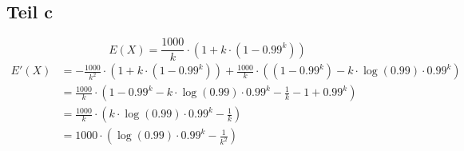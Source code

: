 \documentclass[10pt,a4paper]{article}
\begin{document}
\subsection{Teil c}
\begin{equation}
  E(X) = \frac{1000}{k} \cdot \left( 1 + k \cdot \left( 1 - 0.99^{k} \right) \right)
\end{equation}
\begin{align*}
  E'(X) & = -\frac{1000}{k^{2}} \cdot \left( 1 + k \cdot \left( 1 - 0.99^{k} \right) \right) + \frac{1000}{k} \cdot ((1 - 0.99^{k}) - k \cdot \log(0.99) \cdot 0.99^{k})\\
  & = \frac{1000}{k} \cdot \left( 1 - 0.99^{k} - k \cdot \log(0.99) \cdot 0.99^{k} - \frac{1}{k} - 1 + 0.99^{k} \right)\\
  & = \frac{1000}{k} \cdot \left( k \cdot \log(0.99) \cdot 0.99^{k} - \frac{1}{k} \right)\\
  & = 1000 \cdot \left( \log(0.99) \cdot 0.99^{k} - \frac{1}{k^{2}} \right)\\
\end{align*}
\end{document}
